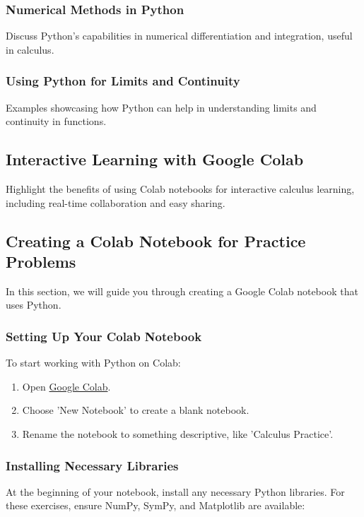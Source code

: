 \documentclass[a4paper,12pt]{book}
\begin{document}
\subsubsection*{Numerical Methods in Python}
Discuss Python's capabilities in numerical differentiation and integration, useful in calculus.

\subsubsection*{Using Python for Limits and Continuity}
Examples showcasing how Python can help in understanding limits and continuity in functions.

\subsection*{Interactive Learning with Google Colab}
Highlight the benefits of using Colab notebooks for interactive calculus learning, including real-time collaboration and easy sharing.

\subsection*{Creating a Colab Notebook for Practice Problems}

In this section, we will guide you through creating a Google Colab notebook that uses Python.

\subsubsection*{Setting Up Your Colab Notebook}
To start working with Python on Colab:

\begin{enumerate}
    \item Open \href{https://colab.research.google.com/}{Google Colab}.
    \item Choose 'New Notebook' to create a blank notebook.
    \item Rename the notebook to something descriptive, like 'Calculus Practice'.
\end{enumerate}

\subsubsection*{Installing Necessary Libraries}
At the beginning of your notebook, install any necessary Python libraries. For these exercises, ensure NumPy, SymPy, and Matplotlib are available:
\end{document}
